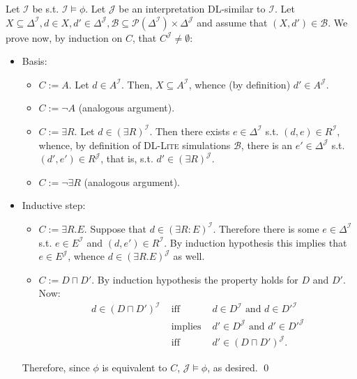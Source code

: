 \documentclass[11pt]{llncs}
\newcommand{\logic}[1]{\textsc{#1}\xspace}
\newcommand{\g}[1]{\logic{#1}}
\newcommand{\inte}{\f{I}}
\newcommand{\tup}[1]{(#1)}
\newcommand{\f}[1]{\mathcal{#1}}
\begin{document}
\proof Let $\inte$ be s.t. $\inte \models \phi$. Let $\f{J}$ be an interpretation
DL-similar to $\inte$. Let
$X \subseteq \Delta^{\f{I}}, d \in X, d' \in \Delta^{\f{J}}, 
\f{B} \subseteq \f{P}(\Delta^{\f{I}}) \times \Delta^{\f{J}}$ and assume that
$\tup{X,d'} \in \f{B}$. 
We prove now, by induction on $C$, that $C^{\f{J}} \neq \emptyset$:
\begin{itemize}
\item Basis:
\begin{itemize}
\item $C := A$. Let $d \in A^{\f{I}}$.
Then, $X \subseteq A^{\f{I}}$, whence (by definition)
$d' \in A^{\f{J}}$.
\item $C := \neg A$ (analogous argument).
\item $C := \exists R$. Let
$d \in (\exists R)^{\f{I}}$. Then there exists
$e \in \Delta^{\f{I}}$ s.t. $\tup{d,e} \in R^{\f{I}}$, whence, by definition of
\g{DL-Lite} simulations $\f{B}$, 
there is an $e' \in \Delta^{\f{J}}$ s.t. $\tup{d',e'} \in R^{\f{J}}$, 
that is, s.t. $d' \in (\exists R)^{\f{J}}$.
\item $C := \neg \exists R$ (analogous argument).
\end{itemize}
\item Inductive step:
\begin{itemize}
\item $C := \exists R . E$. 
Suppose that $d \in (\exists R \colon E)^{\f{I}}$. Therefore there
is some $e \in \Delta^{\f{I}}$ s.t. $e \in E^{\f{I}}$ and $\tup{d,e'} \in R^{\f{I}}$.
By induction hypothesis this implies that $e \in E^{\f{J}}$, whence
$d \in (\exists R . E)^{\f{J}}$ as well.
\item $C := D \sqcap D'$. By induction hypothesis
the property holds for $D$ and $D'$. Now:
\begin{equation*}
\begin{array}{ccl}
d \in (D \sqcap D')^{\f{I}}   	& \text{ iff }     & d \in D^{\f{I}} \text{ and } d \in D'^{\f{I}}\\
		 	        & \text{ implies } & d' \in D^{\f{J}} \text{ and } d' \in D'^{\f{J}}\\
	                        & \text{ iff }     & d' \in (D \sqcap D')^{\f{J}}.
\end{array}
\end{equation*}
\end{itemize}
Therefore, since $\phi$ is equivalent to $C$,
$\f{J} \models \phi$, as desired. \qed
\end{itemize}
\end{document}
